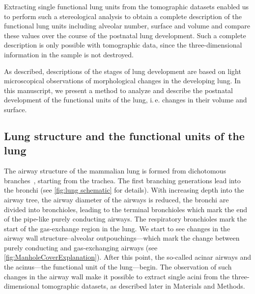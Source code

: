 \documentclass[%
	paper=a4,%
	abstract=true,%
	]{scrartcl}
\newcommand{\ie}{i.\,e.\xspace}
\begin{document}
Extracting single functional lung units from the tomographic datasets enabled us to perform such a stereological analysis to obtain a complete description of the functional lung units including alveolar number, surface and volume and compare these values over the course of the postnatal lung development. Such a complete description is only possible with tomographic data, since the three-dimensional information in the sample is not destroyed.

As \citet{Schittny2007a} described, descriptions of the stages of lung development are based on light microscopical observations of morphological changes in the developing lung. In this manuscript, we present a method to analyze and describe the postnatal development of the functional units of the lung, \ie changes in their volume and surface.

\subsection{Lung structure and the functional units of the lung}
The airway structure of the mammalian lung is formed from dichotomous branches~\cite{Weibel1991}, starting from the trachea. The first branching generations lead into the bronchi (see \autoref{fig:lung schematic} for details). With increasing depth into the airway tree, the airway diameter of the airways is reduced, the bronchi are divided into bronchioles, leading to the terminal bronchioles which mark the end of the pipe-like purely conducting airways. The respiratory bronchioles mark the start of the gas-exchange region in the lung. We start to see changes in the airway wall structure--alveolar outpouchings---which mark the change between purely conducting and gas-exchanging airways (see \autoref{fig:ManholeCoverExplanation}). After this point, the so-called acinar airways and the acinus---the functional unit of the lung---begin. The observation of such changes in the airway wall make it possible to extract single acini from the three-dimensional tomographic datasets, as described later in Materials and Methods.
\end{document}
